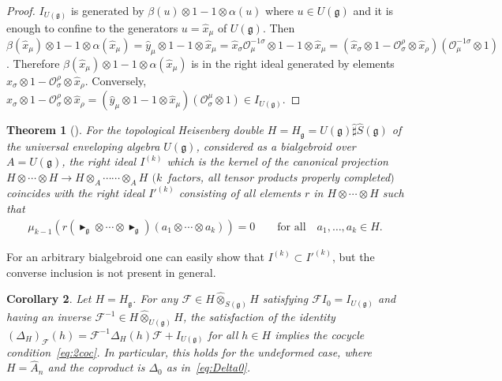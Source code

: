 \documentclass[10pt,a4paper]{amsart}
\def\gg{\mathfrak{g}}
\def\hx{\hat{x}}
\def\hy{\hat{y}}
\newtheorem{Theorem}{Theorem}[section]
\newtheorem{Corollary}[Theorem]{Corollary}
\numberwithin{equation}{section}
\begin{document}
\begin{proof}$I_{U(\gg)}$ is generated by $\beta(u)\otimes 1 - 1\otimes\alpha(u)$ where $u\in U(\gg)$ and it is enough to confine to the generators $u=\hx_\mu$ of $U(\gg)$. Then $\beta(\hx_\mu)\otimes 1 - 1\otimes \alpha(\hx_\mu) = \hy_\mu\otimes 1 - 1\otimes\hx_\mu
= \hx_\sigma \mathcal{O}^{-1\sigma}_\mu\otimes 1- 1\otimes\hx_\mu
= (\hx_\sigma\otimes 1 - \mathcal{O}^\rho_\sigma\otimes\hx_\rho)(\mathcal{O}^{-1\sigma}_\mu\otimes 1)$. Therefore $\beta(\hx_\mu)\otimes 1 - 1\otimes \alpha(\hx_\mu)$ is in the right ideal generated by elements $\hx_\sigma\otimes 1 - \mathcal{O}^\rho_\sigma\otimes\hx_\rho$. Conversely, $\hx_\sigma\otimes 1 - \mathcal{O}^\rho_\sigma\otimes\hx_\rho = (\hy_\mu\otimes 1 - 1\otimes\hx_\mu)(\mathcal{O}^\mu_\sigma\otimes 1)
\in I_{U(\gg)}$.
\end{proof}

\begin{Theorem}[{\cite[Theorem~4]{halg}}]\label{th:th4halg}
For the topological Heisenberg double $H = H_\gg = U(\gg)\hat\sharp\hat{S}(\gg)$ of the universal enveloping algebra $U(\gg)$, considered as a bialgebroid over $A = U(\gg)$, the right ideal $I^{(k)}$ which is the kernel of the canonical projection $H\otimes\cdots\otimes H\to H\otimes_A\cdots \cdots\otimes_A H$ $(k$~factors, all tensor products properly completed$)$ coincides with the right ideal $I'^{(k)}$ consisting of all elements $r$ in $H\otimes\cdots\otimes H$ such that
\begin{gather*}
\mu_{k-1} \left( r (\blacktriangleright_\gg\otimes\cdots\otimes\blacktriangleright_\gg)(a_1\otimes\cdots \otimes a_k)\right)= 0\qquad
\text{for all}\quad a_1,\dots,a_k\in H.
\end{gather*}
\end{Theorem}
For an arbitrary bialgebroid one can easily show that $I^{(k)}\subset I'^{(k)}$, but the converse inclusion is not present in general. \begin{Corollary}\label{cor:FDFimpliesDt}
Let $H = H_\gg$. For any $\mathcal{F}\in H\hat\otimes_{S(\gg)} H$ satisfying $\mathcal{F} I_0 = I_{U(\gg)}$ and having an inverse $\mathcal{F}^{-1}\in H\hat\otimes_{U(\gg)} H$, the satisfaction of the identity $(\Delta_H)_{\mathcal{F}}(h) = \mathcal{F}^{-1}\Delta_H(h)\mathcal{F} + I_{U(\gg)}$ for all $h\in H$ implies the cocycle condition~\eqref{eq:2coc}. In particular, this holds for the undeformed case, where $H = \hat{A}_n$ and the coproduct is $\Delta_0$ as in~\eqref{eq:Delta0}.
\end{Corollary}
\end{document}
